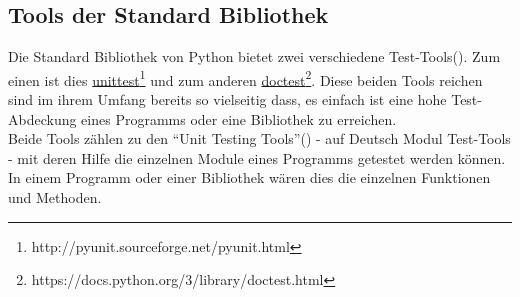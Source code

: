\subsection{Tools der Standard Bibliothek}\label{python-tools:stdlib}

Die Standard Bibliothek von Python bietet zwei verschiedene Test-Tools(\cite{wiki.python:PythonTestingToolsTaxonomy}).
Zum einen ist dies
\href{http://pyunit.sourceforge.net/pyunit.html}{unittest}\footnote{http://pyunit.sourceforge.net/pyunit.html}
und zum anderen
\href{https://docs.python.org/3/library/doctest.html}{doctest}\footnote{https://docs.python.org/3/library/doctest.html}.
Diese beiden Tools reichen sind im ihrem Umfang bereits so vielseitig dass, es einfach ist eine hohe Test-Abdeckung eines Programms oder eine Bibliothek zu erreichen.
\newline
\\
Beide Tools zählen zu den "`Unit Testing Tools"'(\cite{wiki.python:PythonTestingToolsTaxonomy}) -
auf Deutsch Modul Test-Tools - mit deren Hilfe die einzelnen Module eines Programms
getestet werden können. In einem Programm oder einer Bibliothek wären dies die einzelnen
Funktionen und Methoden.



